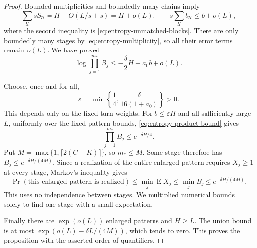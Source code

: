 \begin{proof}
Bounded multiplicities and boundedly many chains imply
\[
 \sum_{\mathcal U}sS_{\mathcal U}=H+O(L/s+s)=H+o(L),
 \qquad
 s\sum_{\mathcal U}b_{\mathcal U}\le b+o(L),
\]
where the second inequality is \eqref{eq:entropy-unmatched-blocks}.
There are only boundedly many stages by
\eqref{eq:entropy-multiplicity}, so all their error terms remain
\(o(L)\).  We have proved
\begin{equation}
 \log\prod_{j=1}^{m_*}B_j
 \le-\frac{\delta}{2}H+a_0b+o(L).
 \label{eq:entropy-product-bound}
\end{equation}

Choose, once and for all,
\[
 \varepsilon=\min\left\{\frac14,
              \frac{\delta}{16(1+a_0)}\right\}>0.
\]
This depends only on the fixed turn weights.  For \(b\le\varepsilon H\)
and all sufficiently large \(L\), uniformly over the fixed pattern
bounds, \eqref{eq:entropy-product-bound} gives
\[
 \prod_{j=1}^{m_*}B_j\le e^{-\delta H/4}.
\]
Put \(M=\max\{1,\lceil2(C+K)\rceil\}\), so \(m_*\le M\).  Some stage
therefore has \(B_j\le e^{-\delta H/(4M)}\).  Since a realization of
the entire enlarged pattern requires \(X_j\ge1\) at every stage,
Markov's inequality gives
\[
 \operatorname{Pr}(\text{this enlarged pattern is realized})
 \le\min_j\operatorname{E}X_j
 \le\min_j B_j
 \le e^{-\delta H/(4M)}.
\]
This uses no independence between stages.  We multiplied numerical
bounds solely to find one stage with a small expectation.

Finally there are \(\exp(o(L))\) enlarged patterns and \(H\ge L\).
The union bound is at most
\(\exp(o(L)-\delta L/(4M))\), which tends to zero.  This proves the
proposition with the asserted order of quantifiers.
\end{proof}
